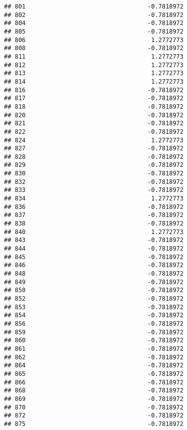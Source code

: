 \documentclass[
]{article}
\begin{document}
\begin{verbatim}
## 801                                  -0.7818972
## 802                                  -0.7818972
## 804                                  -0.7818972
## 805                                  -0.7818972
## 806                                   1.2772773
## 808                                  -0.7818972
## 811                                   1.2772773
## 812                                   1.2772773
## 813                                   1.2772773
## 814                                   1.2772773
## 816                                  -0.7818972
## 817                                  -0.7818972
## 818                                  -0.7818972
## 820                                  -0.7818972
## 821                                  -0.7818972
## 822                                  -0.7818972
## 824                                   1.2772773
## 827                                  -0.7818972
## 828                                  -0.7818972
## 829                                  -0.7818972
## 830                                  -0.7818972
## 832                                  -0.7818972
## 833                                  -0.7818972
## 834                                   1.2772773
## 836                                  -0.7818972
## 837                                  -0.7818972
## 838                                  -0.7818972
## 840                                   1.2772773
## 843                                  -0.7818972
## 844                                  -0.7818972
## 845                                  -0.7818972
## 846                                  -0.7818972
## 848                                  -0.7818972
## 849                                  -0.7818972
## 850                                  -0.7818972
## 852                                  -0.7818972
## 853                                  -0.7818972
## 854                                  -0.7818972
## 856                                  -0.7818972
## 859                                  -0.7818972
## 860                                  -0.7818972
## 861                                  -0.7818972
## 862                                  -0.7818972
## 864                                  -0.7818972
## 865                                  -0.7818972
## 866                                  -0.7818972
## 868                                  -0.7818972
## 869                                  -0.7818972
## 870                                  -0.7818972
## 872                                  -0.7818972
## 875                                  -0.7818972

\end{verbatim}
\end{document}
